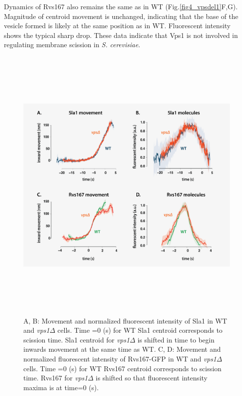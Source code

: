 \vspace{5mm}
Dynamics of Rvs167 also remains the same as in WT (Fig.\ref{fig4_vpsdel1}F,G). Magnitude of centroid movement is unchanged, indicating that the base of the vesicle formed is likely at the same position as in WT. Fluorescent intensity shows the typical sharp drop. These data indicate that Vps1 is not involved in regulating membrane scission in \textit{S. cerevisiae}.  

\vspace{5mm}

	\begin{figure}[H]
	\centering
	\includegraphics[width=14cm,height=14cm,keepaspectratio]{figures/results_final/vps2}
	\caption[Tracking endocytic proteins in \textit{vps1$\Delta$} cells]
	{A, B: Movement and normalized fluorescent intensity of Sla1 in WT and \textit{vps1$\Delta$} cells. Time =0 (s) for WT Sla1 centroid corresponds to scission time. Sla1 centroid for \textit{vps1$\Delta$} is shifted in time to begin inwards movement at the same time as WT. 
		C, D: Movement and normalized fluorescent intensity of Rvs167-GFP in WT and  \textit{vps1$\Delta$} cells. Time =0 (s) for WT Rvs167 centroid corresponds to scission time. Rvs167 for \textit{vps1$\Delta$} is shifted so that fluorescent intensity maxima is at time=0 (s).
		\label{fig4_vpsdel2}}
\end{figure}



